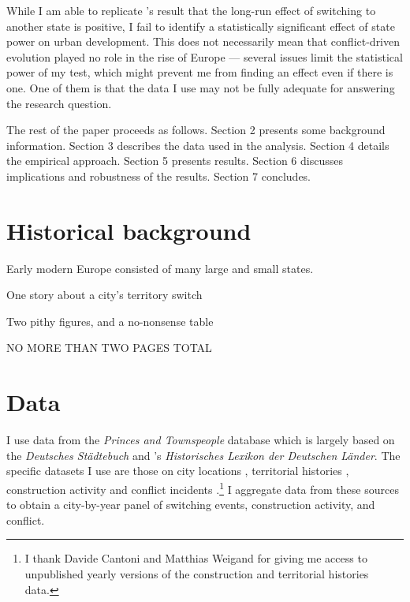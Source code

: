 \documentclass[11pt, a4paper]{article}
\begin{document}
While I am able to replicate \cite{schoenholzer2022}'s result that the long-run effect of switching to another state is positive, I fail to identify a statistically significant effect of state power on urban development. This does not necessarily mean that conflict-driven evolution played no role in the rise of Europe --- several issues limit the statistical power of my test, which might prevent me from finding an effect even if there is one. One of them is that the data I use may not be fully adequate for answering the research question.

The rest of the paper proceeds as follows. Section 2 presents some background information. Section 3 describes the data used in the analysis. Section 4 details the empirical approach. Section 5 presents results. Section 6 discusses implications and robustness of the results. Section 7 concludes.


\section{Historical background}

Early modern Europe consisted of many large and small states. 

One story about a city's territory switch

Two pithy figures, and a no-nonsense table

NO MORE THAN TWO PAGES TOTAL


\section{Data} \label{sec:data}

I use data from the \textit{Princes and Townspeople} database which is largely based on the \textit{Deutsches Städtebuch} \citep{keyser1939} and \cite{kobler2007}'s \textit{Historisches Lexikon der Deutschen Länder}. The specific datasets I use are those on city locations \citep{pt1}, territorial histories \citep{pt2}, construction activity \citep{pt5} and conflict incidents \citep{pt6}.\footnote{I thank Davide Cantoni and Matthias Weigand for giving me access to unpublished yearly versions of the construction and territorial histories data.} I aggregate data from these sources to obtain a city-by-year panel of switching events, construction activity, and conflict. 
\end{document}
